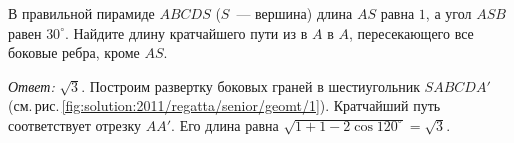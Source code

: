 \problem
В правильной пирамиде $ABCDS$ ($S$~--- вершина) длина $AS$ равна $1$, а угол
$ASB$ равен $30^\circ$.
Найдите длину кратчайшего пути из в $A$ в $A$, пересекающего все боковые ребра,
кроме $AS$.

%
\label{solution:2011/regatta/senior/geomt/1}%
\emph{Ответ:} $\sqrt{3}$.
Построим развертку боковых граней в шестиугольник $SABCDA'$
(см.\,рис.\,\ref{fig:solution:2011/regatta/senior/geomt/1}).
Кратчайший путь соответствует отрезку $AA'$.
Его длина равна $\sqrt{1 + 1 - 2 \cos 120^\circ} = \sqrt{3}$.

\endproblem
